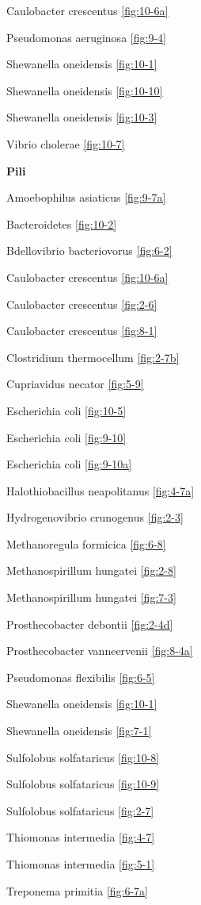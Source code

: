 \documentclass[]{tufte-book}
\begin{document}
Caulobacter crescentus \ref{fig:10-6a}

Pseudomonas aeruginosa \ref{fig:9-4}

Shewanella oneidensis \ref{fig:10-1}

Shewanella oneidensis \ref{fig:10-10}

Shewanella oneidensis \ref{fig:10-3}

Vibrio cholerae \ref{fig:10-7}

\textbf{Pili}

Amoebophilus asiaticus \ref{fig:9-7a}

Bacteroidetes \ref{fig:10-2}

Bdellovibrio bacteriovorus \ref{fig:6-2}

Caulobacter crescentus \ref{fig:10-6a}

Caulobacter crescentus \ref{fig:2-6}

Caulobacter crescentus \ref{fig:8-1}

Clostridium thermocellum \ref{fig:2-7b}

Cupriavidus necator \ref{fig:5-9}

Escherichia coli \ref{fig:10-5}

Escherichia coli \ref{fig:9-10}

Escherichia coli \ref{fig:9-10a}

Halothiobacillus neapolitanus \ref{fig:4-7a}

Hydrogenovibrio crunogenus \ref{fig:2-3}

Methanoregula formicica \ref{fig:6-8}

Methanospirillum hungatei \ref{fig:2-8}

Methanospirillum hungatei \ref{fig:7-3}

Prosthecobacter debontii \ref{fig:2-4d}

Prosthecobacter vanneervenii \ref{fig:8-4a}

Pseudomonas flexibilis \ref{fig:6-5}

Shewanella oneidensis \ref{fig:10-1}

Shewanella oneidensis \ref{fig:7-1}

Sulfolobus solfataricus \ref{fig:10-8}

Sulfolobus solfataricus \ref{fig:10-9}

Sulfolobus solfataricus \ref{fig:2-7}

Thiomonas intermedia \ref{fig:4-7}

Thiomonas intermedia \ref{fig:5-1}

Treponema primitia \ref{fig:6-7a}
\end{document}
